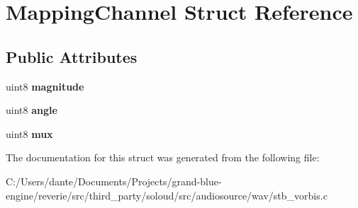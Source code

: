 \hypertarget{struct_mapping_channel}{}\section{Mapping\+Channel Struct Reference}
\label{struct_mapping_channel}
\subsection*{Public Attributes}
\begin{DoxyCompactItemize}
\item 
\mbox{\label{struct_mapping_channel_afd6e4cb4de3874833192c5c67daaa272}} 
uint8 {\bfseries magnitude}
\item 
\mbox{\label{struct_mapping_channel_a78fa29206ca367159792f11c1f604510}} 
uint8 {\bfseries angle}
\item 
\mbox{\label{struct_mapping_channel_a293cfec33390fdd5cee99df910f2d694}} 
uint8 {\bfseries mux}
\end{DoxyCompactItemize}


The documentation for this struct was generated from the following file\+:\begin{DoxyCompactItemize}
\item 
C\+:/\+Users/dante/\+Documents/\+Projects/grand-\/blue-\/engine/reverie/src/third\+\_\+party/soloud/src/audiosource/wav/stb\+\_\+vorbis.\+c\end{DoxyCompactItemize}

